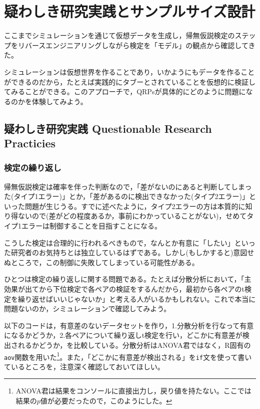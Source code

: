 \documentclass[
  a4paper,
]{ltjsbook}
\begin{document}

\chapter{疑わしき研究実践とサンプルサイズ設計}\label{ux7591ux308fux3057ux304dux7814ux7a76ux5b9fux8df5ux3068ux30b5ux30f3ux30d7ux30ebux30b5ux30a4ux30baux8a2dux8a08}

ここまでシミュレーションを通じて仮想データを生成し，帰無仮説検定のステップをリバースエンジニアリングしながら検定を「モデル」の観点から確認してきた。

シミュレーションは仮想世界を作ることであり，いかようにもデータを作ることができるのだから，たとえば実践的にタブーとされていることを仮想的に検証してみることができる。このアプローチで，QRPsが具体的にどのように問題になるのかを体験してみよう。

\section{疑わしき研究実践 Questionable Research
Practicies}\label{ux7591ux308fux3057ux304dux7814ux7a76ux5b9fux8df5-questionable-research-practicies}

\subsection{検定の繰り返し}\label{ux691cux5b9aux306eux7e70ux308aux8fd4ux3057}

帰無仮説検定は確率を伴った判断なので，「差がないのにあると判断してしまった(タイプ1エラー)」とか，「差があるのに検出できなかった(タイプ2エラー)」といった問題が生じうる。すでに述べたように，タイプ2エラーの方は本質的に知り得ないので(差がどの程度あるか，事前にわかっていることがない)，せめてタイプ1エラーは制御することを目指すことになる。

こうした検定は合理的に行われるべきもので，なんとか有意に「したい」といった研究者のお気持ちとは独立しているはずである。しかし(もしかすると)意図せぬところで，この制御に失敗してしまっている可能性がある。

ひとつは検定の繰り返しに関する問題である。たとえば分散分析において，「主効果が出てから下位検定で各ペアの検証をするんだから，最初から各ペアのt検定を繰り返せばいいじゃないか」と考える人がいるかもしれない。これで本当に問題ないのか，シミュレーションで確認してみよう。

以下のコードは，有意差のないデータセットを作り，1.分散分析を行なって有意になるかどうか，2.各ペアについて繰り返しt検定を行い，どこかに有意差が検出されるかどうか，を比較している。分散分析はANOVA君ではなく，R固有の\texttt{aov}関数を用いた\footnote{ANOVA君は結果をコンソールに直接出力し，戻り値を持たない。ここでは結果の\(p\)値が必要だったので，このようにした。}。また，「どこかに有意差が検出される」を\texttt{if}文を使って書いているところを，注意深く確認しておいてほしい。
\end{document}
